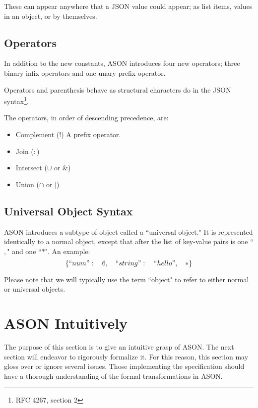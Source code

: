 \documentclass[letterpaper]{article}
\begin{document}
These can appear anywhere that a JSON value could appear; as list items, values
in an object, or by themselves.

\subsection{Operators}
In addition to the new constants, ASON introduces four new operators; three
binary infix operators and one unary prefix operator.

Operators and parenthesis behave as structural characters do in the JSON
syntax\footnote{RFC 4267, section 2}.

\begin{samepage}
The operators, in order of descending precedence, are:

\begin{itemize}
\item Complement (\(!\)) A prefix operator.
\item Join (\(:\))
\item Intersect (\(\cup\) or \(\&\))
\item Union (\(\cap\) or \(|\))
\end{itemize}
\end{samepage}

\begin{samepage}
\subsection{Universal Object Syntax}
ASON introduces a subtype of object called a ``universal object." It is
represented identically to a normal object, except that after the list of
key-value pairs is one ``\(,\)" and one ``\(*\)". An example:
%
\begin{equation}
\{ ``num":\quad6,\quad ``string":\quad``hello",\quad *\}
\end{equation}
\end{samepage}

Please note that we will typically use the term ``object" to refer to either
normal or universal objects.

\section{ASON Intuitively}
The purpose of this section is to give an intuitive grasp of ASON. The next
section will endeavor to rigorously formalize it. For this reason, this section
may gloss over or ignore several issues. Those implementing the specification
should have a thorough understanding of the formal transformations in ASON.
\end{document}
